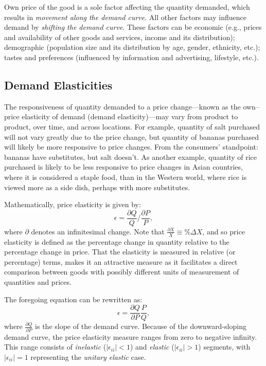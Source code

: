 \documentclass[
]{book}
\begin{document}
Own price of the good is a sole factor affecting the quantity demanded, which results in \emph{movement along the demand curve}. All other factors may influence demand by \emph{shifting the demand curve}. These factors can be economic (e.g., prices and availability of other goods and services, income and its distribution); demographic (population size and its distribution by age, gender, ethnicity, etc.); tastes and preferences (influenced by information and advertising, lifestyle, etc.).

\hypertarget{demand-elasticities}{%
\subsection{Demand Elasticities}\label{demand-elasticities}}

The responsiveness of quantity demanded to a price change---known as the own--price elasticity of demand (demand elasticity)---may vary from product to product, over time, and across locations. For example, quantity of salt purchased will not vary greatly due to the price change, but quantity of bananas purchased will likely be more responsive to price changes. From the consumers' standpoint: bananas have substitutes, but salt doesn't. As another example, quantity of rice purchased is likely to be less responsive to price changes in Asian countries, where it is considered a staple food, than in the Western world, where rice is viewed more as a side dish, perhaps with more substitutes.

Mathematically, price elasticity is given by: \[\epsilon = \frac{\partial Q}{Q}/\frac{\partial P}{P},\] where \(\partial\) denotes an infinitesimal change. Note that \(\frac{\partial X}{X} \equiv \%\Delta X\), and so price elasticity is defined as the percentage change in quantity relative to the percentage change in price. That the elasticity is measured in relative (or percentage) terms, makes it an attractive measure as it facilitates a direct comparison between goods with possibly different units of measurement of quantities and prices.

The foregoing equation can be rewritten as: \[\epsilon = \frac{\partial Q}{\partial P}\frac{P}{Q},\] where \(\frac{\partial Q}{\partial P}\) is the slope of the demand curve. Because of the downward-sloping demand curve, the price elasticity measure ranges from zero to negative infinity. This range consists of \emph{inelastic} (\(|\epsilon_{ii}| < 1\)) and \emph{elastic} (\(|\epsilon_{ii}| > 1\)) segments, with \(|\epsilon_{ii}| = 1\) representing the \emph{unitary elastic} case.
\end{document}
